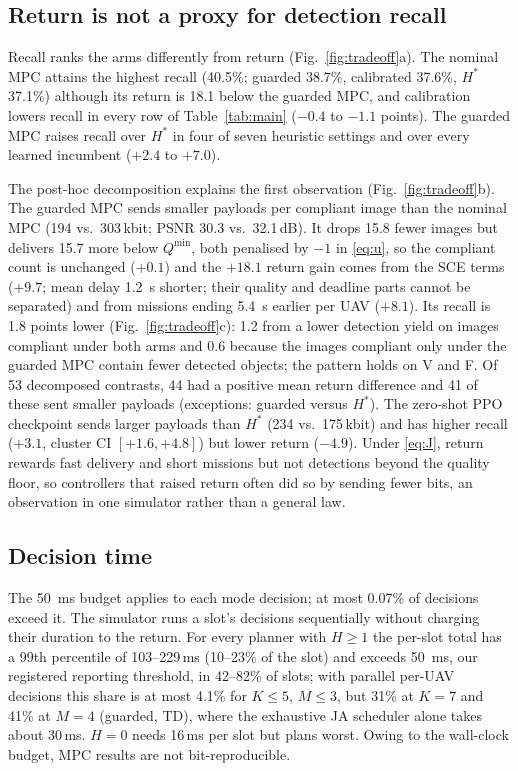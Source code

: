 \documentclass[final,3p,times,twocolumn]{elsarticle}
\begin{document}
\subsection{Return is not a proxy for detection recall}
Recall ranks the arms differently from return (Fig.~\ref{fig:tradeoff}a). The nominal MPC attains the highest recall
(40.5\%; guarded 38.7\%, calibrated 37.6\%, $H^*$ 37.1\%) although its return is 18.1 below the guarded MPC, and
calibration lowers recall in every row of Table~\ref{tab:main} ($-0.4$ to $-1.1$ points). The guarded MPC raises recall
over $H^*$ in four of seven heuristic settings and over every learned incumbent ($+2.4$ to $+7.0$).

The post-hoc decomposition explains the first observation (Fig.~\ref{fig:tradeoff}b). The guarded MPC sends smaller
payloads per compliant image than the nominal MPC (194 vs.\ 303\,kbit; PSNR 30.3 vs.\ 32.1\,dB). It drops 15.8 fewer
images but delivers 15.7 more below $Q^{\min}$, both penalised by $-1$ in \eqref{eq:u}, so the compliant count is
unchanged ($+0.1$) and the $+18.1$ return gain comes from the SCE terms ($+9.7$; mean delay \SI{1.2}{s} shorter; their
quality and deadline parts cannot be separated) and from missions ending \SI{5.4}{s} earlier per UAV ($+8.1$). Its
recall is 1.8 points lower (Fig.~\ref{fig:tradeoff}c): 1.2 from a lower detection yield on images compliant under both
arms and 0.6 because the images compliant only under the guarded MPC contain fewer detected objects; the pattern holds
on V and F. Of 53 decomposed contrasts, 44 had a positive mean return difference and 41 of these sent smaller payloads
(exceptions: guarded versus $H^*$). The zero-shot PPO checkpoint sends larger payloads than $H^*$ (234 vs.\ 175\,kbit)
and has higher recall ($+3.1$, cluster CI $[+1.6,+4.8]$) but lower return ($-4.9$). Under \eqref{eq:J}, return rewards
fast delivery and short missions but not detections beyond the quality floor, so controllers that raised return often
did so by sending fewer bits, an observation in one simulator rather than a general law.

\subsection{Decision time}
The \SI{50}{ms} budget applies to each mode decision; at most 0.07\% of decisions exceed it. The simulator runs a
slot's decisions sequentially without charging their duration to the return. For every planner with $H{\ge}1$ the
per-slot total has a 99th percentile of 103--229\,ms (10--23\% of the slot) and exceeds \SI{50}{ms}, our registered
reporting threshold, in 42--82\% of slots; with parallel per-UAV decisions this share is at most 4.1\% for $K{\le}5$,
$M{\le}3$, but 31\% at $K{=}7$ and 41\% at $M{=}4$ (guarded, TD), where the exhaustive JA scheduler alone takes about
30\,ms. $H{=}0$ needs 16\,ms per slot but plans worst. Owing to the wall-clock budget, MPC results are not
bit-reproducible.
\end{document}
